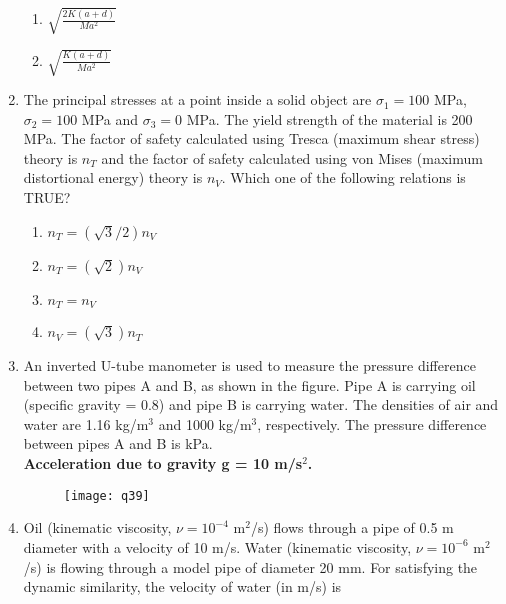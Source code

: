 \documentclass[journal,11pt,onecolumn]{IEEEtran}
\begin{document}
\begin{enumerate}[resume]
\begin{enumerate}
              \item $\sqrt{\frac{2K(a + d)}{Ma^2}}$

              \item $\sqrt{\frac{K(a + d)}{Ma^2}}$

          \end{enumerate}

    \item The principal stresses at a point inside a solid object are $\sigma_1 = 100$ MPa, $\sigma_2 = 100$ MPa and $\sigma_3 = 0$ MPa. The yield strength of the material is 200 MPa. The factor of safety calculated using Tresca (maximum shear stress) theory is $n_T$ and the factor of safety calculated using von Mises (maximum distortional energy) theory is $n_V$. Which one of the following relations is TRUE?

          \begin{enumerate}

              \item $n_T = (\sqrt{3}/2)n_V$

              \item $n_T = (\sqrt{2})n_V$

              \item $n_T = n_V$

              \item $n_V = (\sqrt{3})n_T$

          \end{enumerate}

    \item An inverted U-tube manometer is used to measure the pressure difference between two pipes A and B, as shown in the figure. Pipe A is carrying oil (specific gravity = 0.8) and pipe B is carrying water. The densities of air and water are 1.16 kg/m$^3$ and 1000 kg/m$^3$, respectively. The pressure difference between pipes A and B is \underline{\hspace{2cm}} kPa.\\
          \textbf{Acceleration due to gravity g = 10 m/s$^2$.}
          \begin{figure}[H]
              \centering
              \texttt{[image: q39]}
              \caption{}
              \label{q39}
          \end{figure}

    \item Oil (kinematic viscosity, $\nu = 10^{-4}$ m$^2$/s) flows through a pipe of 0.5 m diameter with a velocity of 10 m/s. Water (kinematic viscosity, $\nu = 10^{-6}$ m$^2$/s) is flowing through a model pipe of diameter 20 mm. For satisfying the dynamic similarity, the velocity of water (in m/s) is \underline{\hspace{2cm}}


\end{enumerate}
\end{document}
